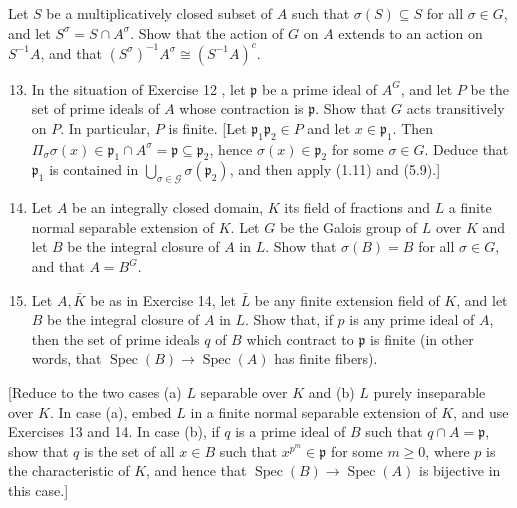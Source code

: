 \documentclass{standalone}
\theoremstyle{definition}
\theoremstyle{remark}
\begin{document}
Let $S$ be a multiplicatively closed subset of $A$ such that $\sigma(S) \subseteq S$ for all $\sigma \in G$, and let $S^{\sigma}=S \cap A^{\sigma}$. Show that the action of $G$ on $A$ extends to an action on $S^{-1} A$, and that $\left(S^{\sigma}\right)^{-1} A^{\sigma} \cong\left(S^{-1} A\right)^{c}$.

\begin{enumerate}
  \setcounter{enumi}{12}
  \item In the situation of Exercise 12 , let $\mathfrak{p}$ be a prime ideal of $A^{G}$, and let $P$ be the set of prime ideals of $A$ whose contraction is $\mathfrak{p}$. Show that $G$ acts transitively on $P$. In particular, $P$ is finite. [Let $\mathfrak{p}_{1} \mathfrak{p}_{2} \in P$ and let $x \in \mathfrak{p}_{1}$. Then $\Pi_{\sigma} \sigma(x) \in \mathfrak{p}_{1} \cap A^{\sigma}=\mathfrak{p} \subseteq \mathfrak{p}_{2}$, hence $\sigma(x) \in \mathfrak{p}_{2}$ for some $\sigma \in G$. Deduce that $\mathfrak{p}_{1}$ is contained in $\bigcup_{\sigma \in \mathcal{G}} \sigma\left(\mathfrak{p}_{2}\right)$, and then apply (1.11) and (5.9).]

  \item Let $A$ be an integrally closed domain, $K$ its field of fractions and $L$ a finite normal separable extension of $K$. Let $G$ be the Galois group of $L$ over $K$ and let $B$ be the integral closure of $A$ in $L$. Show that $\sigma(B)=B$ for all $\sigma \in G$, and that $A=B^{G}$.

  \item Let $A, \bar{K}$ be as in Exercise 14, let $\bar{L}$ be any finite extension field of $K$, and let $B$ be the integral closure of $A$ in $L$. Show that, if $p$ is any prime ideal of $A$, then the set of prime ideals $q$ of $B$ which contract to $\mathfrak{p}$ is finite (in other words, that $\operatorname{Spec}(B) \rightarrow \operatorname{Spec}(A)$ has finite fibers).

\end{enumerate}

[Reduce to the two cases (a) $L$ separable over $K$ and (b) $L$ purely inseparable over $K$. In case (a), embed $L$ in a finite normal separable extension of $K$, and use Exercises 13 and 14. In case (b), if $q$ is a prime ideal of $B$ such that $q \cap A=\mathfrak{p}$, show that $q$ is the set of all $x \in B$ such that $x^{p^{m}} \in \mathfrak{p}$ for some $m \geqslant 0$, where $p$ is the characteristic of $K$, and hence that $\operatorname{Spec}(B) \rightarrow \operatorname{Spec}(A)$ is bijective in this case.]
\end{document}
